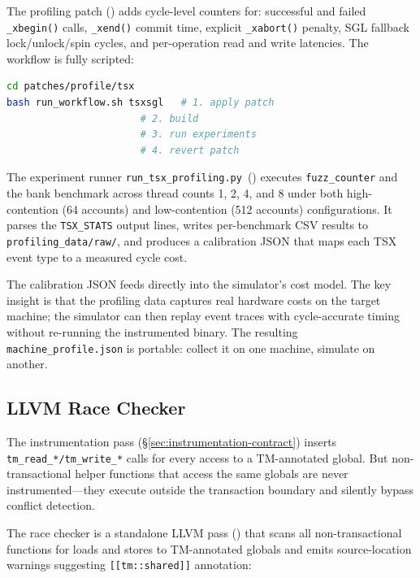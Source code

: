 The profiling patch ()
adds cycle-level counters for: successful and failed \texttt{\_xbegin()}
calls, \texttt{\_xend()} commit time, explicit \texttt{\_xabort()}
penalty, SGL fallback lock/unlock/spin cycles, and per-operation read
and write latencies.  The workflow is fully scripted:

\begin{lstlisting}[language=bash, caption={The profiling workflow.}]
cd patches/profile/tsx
bash run_workflow.sh tsxsgl   # 1. apply patch
                       # 2. build
                       # 3. run experiments
                       # 4. revert patch
\end{lstlisting}

\noindent
The experiment runner \texttt{run\_tsx\_profiling.py}~()
executes \texttt{fuzz\_counter} and the bank benchmark across thread
counts 1, 2, 4, and 8 under both high-contention (64 accounts) and
low-contention (512 accounts) configurations.  It parses the
\texttt{TSX\_STATS} output lines, writes per-benchmark CSV results to
\texttt{profiling\_data/raw/}, and produces a calibration JSON that
maps each TSX event type to a measured cycle cost.

The calibration JSON feeds directly into the simulator's cost model.
The key insight is that the
profiling data captures real hardware costs on the target machine; the
simulator can then replay event traces with cycle-accurate timing
without re-running the instrumented binary.  The resulting
\texttt{machine\_profile.json} is portable: collect it on one machine,
simulate on another.

\subsection{LLVM Race Checker}
\label{sec:race-checker}

The instrumentation pass (\S\ref{sec:instrumentation-contract}) inserts
\texttt{tm\_read\_*/tm\_write\_*} calls for every access to a
TM-annotated global.  But non-transactional helper functions that
access the same globals are never instrumented---they execute outside
the transaction boundary and silently bypass conflict detection.

The race checker is a standalone LLVM pass
() that scans all
non-transactional functions for loads and stores to TM-annotated
globals and emits source-location warnings suggesting
\texttt{[[tm::shared]]} annotation:

